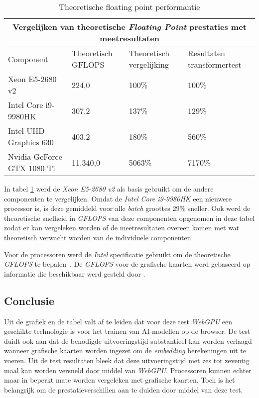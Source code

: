\begin{table}[t]
    \begin{tabular}{ |p{5.5cm}|p{2.5cm}|p{2.5cm}|p{3.5cm}|  }
        \hline
        \multicolumn{4}{|c|}{Vergelijken van theoretische \textit{Floating Point} prestaties met meetresultaten} \\
        \hline
        Component& Theoretisch GFLOPS & Theoretisch vergelijking & Resultaten transformertest\\
        \hline
            Xeon E5-2680 v2             & 224,0     & 100\%  & 100\%       \\
            Intel Core i9-9980HK        & 307,2     & 137\%  & 129\%    \\
            Intel UHD Graphics 630      & 403,2     & 180\%  & 560\%    \\
            Nvidia GeForce GTX 1080 Ti  & 11.340,0  & 5063\% & 7170\%   \\
        \hline
    \end{tabular}
    \caption[\textit{Floating point} \textit{CPU's} en \textit{GPU's} \autocite{Intel2024, Intel2024a, TechPowerUp2017, TechPowerUp2017a}]{Theoretische floating point performantie \autocite{Intel2024, Intel2024a, TechPowerUp2017, TechPowerUp2017a}}
    \label{tab:TheoreticalVersusMeasuredPerf}
\end{table}

In tabel \ref{tab:TheoreticalVersusMeasuredPerf} werd de \textit{Xeon E5-2680 v2} als basis gebruikt om de andere componenten te vergelijken. Omdat de \textit{Intel Core i9-9980HK} een nieuwere processor is, is deze gemiddeld voor alle \textit{batch} groottes 29\% sneller. Ook werd de theoretische snelheid in \textit{GFLOPS} van deze componenten opgenomen in deze tabel zodat er kan vergeleken worden of de meetresultaten overeen komen met wat theoretisch verwacht worden van de individuele componenten. 

\bigbreak{}

Voor de processoren werd de \textit{Intel} specificatie gebruikt om de theoretische \textit{GFLOPS} te bepalen~\autocite{Intel2024, Intel2024a}. De \textit{GFLOPS} voor de grafische kaarten werd gebaseerd op informatie die beschikbaar werd gesteld door \textcite{TechPowerUp2017, TechPowerUp2017a}.

\subsection{Conclusie}

Uit de grafiek en de tabel valt af te leiden dat voor deze test \textit{WebGPU} een geschikte technologie is voor het trainen van AI-modellen op de browser. De test duidt ook aan dat de benodigde uitvoeringstijd substantieel kan worden verlaagd wanneer grafische kaarten worden ingezet om de \textit{embedding} berekeningen uit te voeren. Uit de test resultaten bleek dat deze uitvoeringstijd met zes tot zeventig maal kan worden versneld door middel van \textit{WebGPU}. Processoren kunnen echter maar in beperkt mate worden vergeleken met grafische kaarten. Toch is het belangrijk om de prestatieverschillen aan te duiden door middel van deze test. 

